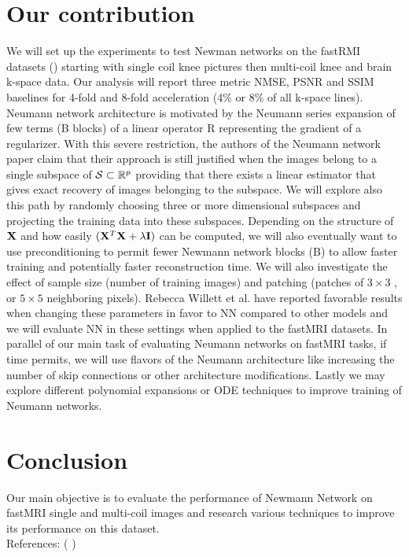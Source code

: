 \documentclass[12pt,twoside]{article}
\begin{document}
\section{Our contribution}
We will set up the experiments to test Newman networks on the fastRMI datasets (\cite{DBLP:journals/corr/abs-1811-08839}) starting with single coil knee pictures then multi-coil knee and brain k-space data.
Our analysis will report three metric NMSE, PSNR and SSIM baselines for 4-fold and 8-fold acceleration (4\% or 8\% of all k-space lines).
Neumann network architecture is motivated by the Neumann series expansion of few terms (B blocks) of a linear operator R representing the gradient of a regularizer.
With this severe restriction, the authors of the Neumann network paper claim that their approach is still justified when the images belong to a single subspace of $\mathcal{S} \subset \mathbb{R}^p$
providing that there exists a linear estimator that gives exact recovery of images belonging to the subspace. We will explore also this path by randomly choosing three or more dimensional subspaces and
projecting the training data into these subspaces. Depending on the structure of ${\mathbf X}$ and how easily $({\mathbf X}^T {\mathbf X} + \lambda {\mathbf I})$ can be computed, 
we will also eventually want to use preconditioning to permit fewer Newmann network blocks (B)
to allow faster training and potentially faster reconstruction time. We will also investigate the effect of sample size (number of training images) and patching (patches of $3 \times 3$ , or $5 \times 5$ neighboring pixels).
\cite{DBLP:journals/corr/abs-1901-03707} Rebecca Willett et al. have reported favorable results when changing these parameters in favor to NN compared to other models and we will evaluate NN in these settings when applied to the fastMRI datasets.
In parallel of our main task of evaluating Neumann networks on fastMRI tasks, if time permits, we will use flavors of the Neumann architecture like increasing the number of skip connections or other architecture modifications. 
Lastly we may explore different polynomial expansions or ODE techniques to improve training of Neumann networks.

\section{Conclusion}
Our main objective is to evaluate the performance of Newmann Network on fastMRI single and multi-coil images and research various techniques to improve its performance on this dataset.\\

References: (\cite{DBLP:journals/corr/abs-1901-03707} \cite{DBLP:journals/corr/abs-1811-08839} \cite{DBLP:journals/corr/KamilovM15} \cite{DBLP:journals/corr/RomanoEM16} \cite{DBLP:journals/corr/abs-1712-02862})

 

\end{document}
